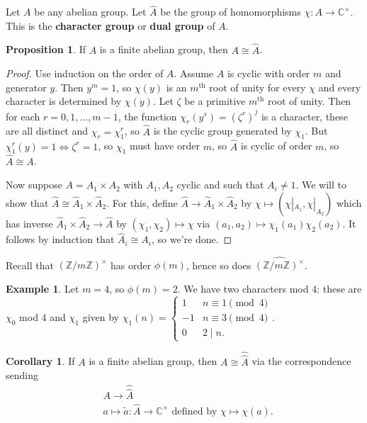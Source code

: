 \documentclass{article}
\theoremstyle{definition}
\newtheorem{cor}[theorem]{Corollary}
\newtheorem{prop}[theorem]{Proposition}
\newtheorem{example}{Example}[section]
\begin{document}
Let $A$ be any abelian group. Let $\widehat{A}$ be the group of homomorphisms $\chi : A \to \mathbb{C}^\times$. This is the \textbf{character group} or \textbf{dual group} of $A$.
\begin{prop}\label{prop2.28}
    If $A$ is a finite abelian group, then $A \cong \widehat{A}$.
\end{prop}
\begin{proof}
    Use induction on the order of $A$. Assume $A$ is cyclic with order $m$ and generator $y$. Then $y^m=1$, so $\chi(y)$ is an $m^{\text{th}}$ root of unity for every $\chi$ and every character is determined by $\chi(y)$. Let $\zeta$ be a primitive $m^{\text{th}}$ root of unity. Then for each $r=0,1,\ldots,m-1$, the function $\chi_r(y^s) = (\zeta^r)^j$ is a character, these are all distinct and $\chi_r = \chi_1^r$, so $\widehat{A}$ is the cyclic group generated by $\chi_1$. But $\chi_1^r(y) = 1 \iff \zeta^r = 1$, so $\chi_1$ must have order $m$, so $\widehat{A}$ is cyclic of order $m$, so $\widehat{A} \cong A$.
    \vspace{1mm}
     
    Now suppose $A = A_1 \times A_2$ with $A_1,A_2$ cyclic and such that $A_i \neq 1$. We will to show that $\widehat{A} \cong \widehat{A}_1 \times \widehat{A}_2$. For this, define $\widehat{A} \to \widehat{A}_1 \times \widehat{A}_2$ by $\chi \mapsto (\chi|_{A_1}, \chi|_{A_2})$ which has inverse $\widehat{A}_1 \times \widehat{A}_2 \to \widehat{A}$ by $(\chi_1,\chi_2) \mapsto \chi$ via $(a_1,a_2) \mapsto \chi_1(a_1)\chi_2(a_2)$. It follows by induction that $\widehat{A}_i \cong A_i$, so we're done.
\end{proof}
Recall that $(\mathbb{Z}/m\mathbb{Z})^\times$ has order $\phi(m)$, hence so does $\widehat{(\mathbb{Z}/m\mathbb{Z})^\times}$.
\begin{example}
    Let $m=4$, so $\phi(m)=2$. We have two characters mod 4: these are $\chi_0$ mod 4 and $\chi_1$ given by $\chi_1(n) = \begin{cases}
        1 & n \equiv 1 \pmod{4}\\
        -1 & n \equiv 3 \pmod{4}\\
        0 & 2 \mid n.
    \end{cases}$.
\end{example}
\begin{cor}\label{cor2.29}
    If $A$ is a finite abelian group, then $A \cong \widehat{\widehat{A}}$ via the correspondence sending 
    \begin{align*}
        &A \to \widehat{\widehat{A}}\\
        &a \mapsto \tilde{a} : \widehat{A} \to \mathbb{C}^\times \text{ defined by }\chi \mapsto \chi(a).
    \end{align*}
\end{cor}
\end{document}
